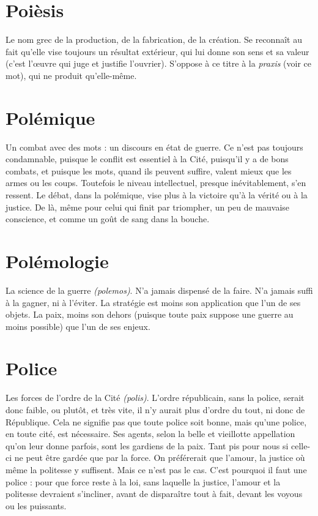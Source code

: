 \section{Poièsis}
Le nom grec de la production, de la fabrication, de la création. Se
reconnaît au fait qu’elle vise toujours un résultat extérieur, qui lui
donne son sens et sa valeur (c’est l’œuvre qui juge et justifie l’ouvrier). S'oppose
à ce titre à la {\it praxis} (voir ce mot), qui ne produit qu’elle-même.

\section{Polémique}
Un combat avec des mots : un discours en état de guerre. Ce
n'est pas toujours condamnable, puisque le conflit est essentiel
à la Cité, puisqu'il y a de bons combats, et puisque les mots, quand ils peuvent
suffire, valent mieux que les armes ou les coups. Toutefois le niveau intellectuel,
presque inévitablement, s’en ressent. Le débat, dans la polémique, vise
plus à la victoire qu’à la vérité ou à la justice. De là, même pour celui qui finit
par triompher, un peu de mauvaise conscience, et comme un goût de sang dans
la bouche.

\section{Polémologie}
La science de la guerre {\it (polemos)}. N’a jamais dispensé de
la faire. N'a jamais suffi à la gagner, ni à l’éviter. La stratégie
est moins son application que l’un de ses objets. La paix, moins son
dehors (puisque toute paix suppose une guerre au moins possible) que l’un de
ses enjeux.

\section{Police}
Les forces de l’ordre de la Cité {\it (polis)}. L'ordre républicain, sans la
police, serait donc faible, ou plutôt, et très vite, il n’y aurait plus
d'ordre du tout, ni donc de République. Cela ne signifie pas que toute
police soit bonne, mais qu’une police, en toute cité, est nécessaire. Ses
agents, selon la belle et vieillotte appellation qu’on leur donne parfois, sont
les gardiens de la paix. Tant pis pour nous si celle-ci ne peut être gardée que
par la force. On préférerait que l'amour, la justice où même la politesse y
suffisent. Mais ce n’est pas le cas. C’est pourquoi il faut une police : pour
que force reste à la loi, sans laquelle la justice, l’amour et la politesse
devraient s’incliner, avant de disparaître tout à fait, devant les voyous ou les
puissants.

